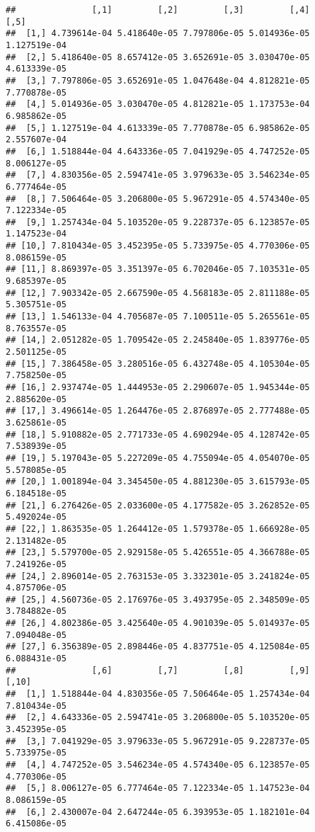 \documentclass[
]{article}
\begin{document}
\begin{verbatim}
##               [,1]         [,2]         [,3]         [,4]         [,5]
##  [1,] 4.739614e-04 5.418640e-05 7.797806e-05 5.014936e-05 1.127519e-04
##  [2,] 5.418640e-05 8.657412e-05 3.652691e-05 3.030470e-05 4.613339e-05
##  [3,] 7.797806e-05 3.652691e-05 1.047648e-04 4.812821e-05 7.770878e-05
##  [4,] 5.014936e-05 3.030470e-05 4.812821e-05 1.173753e-04 6.985862e-05
##  [5,] 1.127519e-04 4.613339e-05 7.770878e-05 6.985862e-05 2.557607e-04
##  [6,] 1.518844e-04 4.643336e-05 7.041929e-05 4.747252e-05 8.006127e-05
##  [7,] 4.830356e-05 2.594741e-05 3.979633e-05 3.546234e-05 6.777464e-05
##  [8,] 7.506464e-05 3.206800e-05 5.967291e-05 4.574340e-05 7.122334e-05
##  [9,] 1.257434e-04 5.103520e-05 9.228737e-05 6.123857e-05 1.147523e-04
## [10,] 7.810434e-05 3.452395e-05 5.733975e-05 4.770306e-05 8.086159e-05
## [11,] 8.869397e-05 3.351397e-05 6.702046e-05 7.103531e-05 9.685397e-05
## [12,] 7.903342e-05 2.667590e-05 4.568183e-05 2.811188e-05 5.305751e-05
## [13,] 1.546133e-04 4.705687e-05 7.100511e-05 5.265561e-05 8.763557e-05
## [14,] 2.051282e-05 1.709542e-05 2.245840e-05 1.839776e-05 2.501125e-05
## [15,] 7.386458e-05 3.280516e-05 6.432748e-05 4.105304e-05 7.758250e-05
## [16,] 2.937474e-05 1.444953e-05 2.290607e-05 1.945344e-05 2.885620e-05
## [17,] 3.496614e-05 1.264476e-05 2.876897e-05 2.777488e-05 3.625861e-05
## [18,] 5.910882e-05 2.771733e-05 4.690294e-05 4.128742e-05 7.538939e-05
## [19,] 5.197043e-05 5.227209e-05 4.755094e-05 4.054070e-05 5.578085e-05
## [20,] 1.001894e-04 3.345450e-05 4.881230e-05 3.615793e-05 6.184518e-05
## [21,] 6.276426e-05 2.033600e-05 4.177582e-05 3.262852e-05 5.492024e-05
## [22,] 1.863535e-05 1.264412e-05 1.579378e-05 1.666928e-05 2.131482e-05
## [23,] 5.579700e-05 2.929158e-05 5.426551e-05 4.366788e-05 7.241926e-05
## [24,] 2.896014e-05 2.763153e-05 3.332301e-05 3.241824e-05 4.875706e-05
## [25,] 4.560736e-05 2.176976e-05 3.493795e-05 2.348509e-05 3.784882e-05
## [26,] 4.802386e-05 3.425640e-05 4.901039e-05 5.014937e-05 7.094048e-05
## [27,] 6.356389e-05 2.898446e-05 4.837751e-05 4.125084e-05 6.088431e-05
##               [,6]         [,7]         [,8]         [,9]        [,10]
##  [1,] 1.518844e-04 4.830356e-05 7.506464e-05 1.257434e-04 7.810434e-05
##  [2,] 4.643336e-05 2.594741e-05 3.206800e-05 5.103520e-05 3.452395e-05
##  [3,] 7.041929e-05 3.979633e-05 5.967291e-05 9.228737e-05 5.733975e-05
##  [4,] 4.747252e-05 3.546234e-05 4.574340e-05 6.123857e-05 4.770306e-05
##  [5,] 8.006127e-05 6.777464e-05 7.122334e-05 1.147523e-04 8.086159e-05
##  [6,] 2.430007e-04 2.647244e-05 6.393953e-05 1.182101e-04 6.415086e-05

\end{verbatim}
\end{document}
